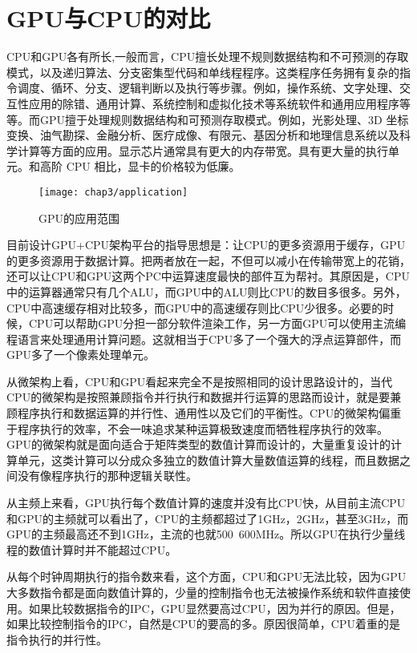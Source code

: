   \section{GPU与CPU的对比}
    CPU和GPU各有所长,一般而言，CPU擅长处理不规则数据结构和不可预测的存取模式，以及递归算法、分支密集型代码和单线程程序。这类程序任务拥有复杂的指令调度、循环、分支、逻辑判断以及执行等步骤。例如，操作系统、文字处理、交互性应用的除错、通用计算、系统控制和虚拟化技术等系统软件和通用应用程序等等。而GPU擅于处理规则数据结构和可预测存取模式。例如，光影处理、3D 坐标变换、油气勘探、金融分析、医疗成像、有限元、基因分析和地理信息系统以及科学计算等方面的应用。显示芯片通常具有更大的内存带宽。具有更大量的执行单元。和高阶 CPU 相比，显卡的价格较为低廉。
    \begin{figure}[htp]
      \centering
      \texttt{[image: chap3/application]}
      \caption{GPU的应用范围}
    \end{figure}
    \par
    目前设计GPU+CPU架构平台的指导思想是：让CPU的更多资源用于缓存，GPU的更多资源用于数据计算。把两者放在一起，不但可以减小在传输带宽上的花销，还可以让CPU和GPU这两个PC中运算速度最快的部件互为帮衬。其原因是，CPU中的运算器通常只有几个ALU，而GPU中的ALU则比CPU的数目多很多。另外，CPU中高速缓存相对比较多，而GPU中的高速缓存则比CPU少很多。必要的时候，CPU可以帮助GPU分担一部分软件渲染工作，另一方面GPU可以使用主流编程语言来处理通用计算问题。这就相当于CPU多了一个强大的浮点运算部件，而GPU多了一个像素处理单元。
    \par
    从微架构上看，CPU和GPU看起来完全不是按照相同的设计思路设计的，当代CPU的微架构是按照兼顾指令并行执行和数据并行运算的思路而设计，就是要兼顾程序执行和数据运算的并行性、通用性以及它们的平衡性。CPU的微架构偏重于程序执行的效率，不会一味追求某种运算极致速度而牺牲程序执行的效率。GPU的微架构就是面向适合于矩阵类型的数值计算而设计的，大量重复设计的计算单元，这类计算可以分成众多独立的数值计算大量数值运算的线程，而且数据之间没有像程序执行的那种逻辑关联性。
    \par
    从主频上来看，GPU执行每个数值计算的速度并没有比CPU快，从目前主流CPU和GPU的主频就可以看出了，CPU的主频都超过了1GHz，2GHz，甚至3GHz，而GPU的主频最高还不到1GHz，主流的也就500~600MHz。所以GPU在执行少量线程的数值计算时并不能超过CPU。
    \par
    从每个时钟周期执行的指令数来看，这个方面，CPU和GPU无法比较，因为GPU大多数指令都是面向数值计算的，少量的控制指令也无法被操作系统和软件直接使用。如果比较数据指令的IPC，GPU显然要高过CPU，因为并行的原因。但是，如果比较控制指令的IPC，自然是CPU的要高的多。原因很简单，CPU着重的是指令执行的并行性。
